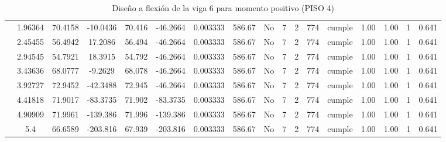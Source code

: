 \begin{table}[H]
{\begin{tabular}{|c|c|c|c|c|c|c|c|c|c|c|c|c|c|c|c|c|}
\cline{2-17}        & 1.96364 & 70.4158 & -10.0436 & 70.416 & -46.2664 & 0.003333 & 586.67 & No  & 7   & 2   & 774 & \cellcolor[rgb]{ .776,  .937,  .808}cumple & 1.00 & 1.00 & 1   & 0.641 \bigstrut\\
\cline{2-17}        & 2.45455 & 56.4942 & 17.2086 & 56.494 & -46.2664 & 0.003333 & 586.67 & No  & 7   & 2   & 774 & \cellcolor[rgb]{ .776,  .937,  .808}cumple & 1.00 & 1.00 & 1   & 0.641 \bigstrut\\
\cline{2-17}        & 2.94545 & 54.7921 & 18.3915 & 54.792 & -46.2664 & 0.003333 & 586.67 & No  & 7   & 2   & 774 & \cellcolor[rgb]{ .776,  .937,  .808}cumple & 1.00 & 1.00 & 1   & 0.641 \bigstrut\\
\cline{2-17}        & 3.43636 & 68.0777 & -9.2629 & 68.078 & -46.2664 & 0.003333 & 586.67 & No  & 7   & 2   & 774 & \cellcolor[rgb]{ .776,  .937,  .808}cumple & 1.00 & 1.00 & 1   & 0.641 \bigstrut\\
\cline{2-17}        & 3.92727 & 72.9452 & -42.3488 & 72.945 & -46.2664 & 0.003333 & 586.67 & No  & 7   & 2   & 774 & \cellcolor[rgb]{ .776,  .937,  .808}cumple & 1.00 & 1.00 & 1   & 0.641 \bigstrut\\
\cline{2-17}        & 4.41818 & 71.9017 & -83.3735 & 71.902 & -83.3735 & 0.003333 & 586.67 & No  & 7   & 2   & 774 & \cellcolor[rgb]{ .776,  .937,  .808}cumple & 1.00 & 1.00 & 1   & 0.641 \bigstrut\\
\cline{2-17}        & 4.90909 & 71.9961 & -139.386 & 71.996 & -139.386 & 0.003333 & 586.67 & No  & 7   & 2   & 774 & \cellcolor[rgb]{ .776,  .937,  .808}cumple & 1.00 & 1.00 & 1   & 0.641 \bigstrut\\
\cline{2-17}        & 5.4 & 66.6589 & -203.816 & 67.939 & -203.816 & 0.003333 & 586.67 & No  & 7   & 2   & 774 & \cellcolor[rgb]{ .776,  .937,  .808}cumple & 1.00 & 1.00 & 1   & 0.641 \bigstrut\\
    \hline
    \end{tabular}%


  

  }%
    \caption{Diseño a flexión de la viga 6 para momento positivo (PISO 4) }
  \label{tab:F VG6 P4 M+}%
\end{table}%

